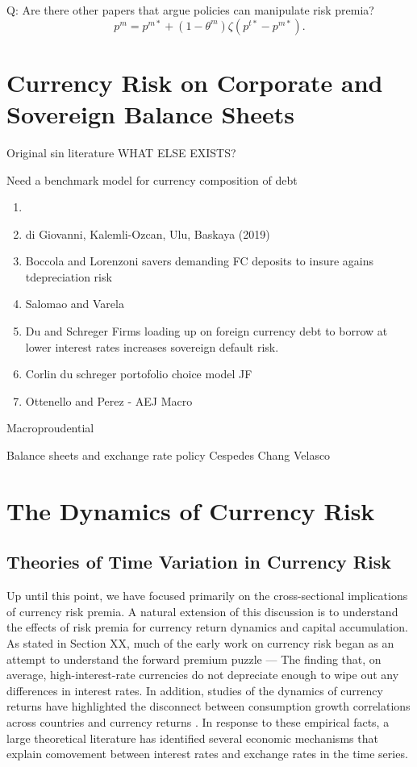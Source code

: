 \documentclass{ar-1col}
\begin{document}
Q: Are there other papers that argue policies can manipulate risk premia?
\begin{equation*}
  p^m = p^{m \ast} + (1 - \theta^m) \zeta (p^{t \ast} - p^{m \ast}).
\end{equation*}

\section{Currency Risk on Corporate and Sovereign Balance Sheets}
Original sin literature WHAT ELSE EXISTS?

Need a benchmark model for currency composition of debt
\begin{enumerate}
\item \citet{Richers2019}
\item di Giovanni, Kalemli-Ozcan, Ulu, Baskaya (2019)
\item Boccola and Lorenzoni savers demanding FC deposits to insure agains tdepreciation risk
\item Salomao and Varela
\item Du and Schreger Firms loading up on foreign currency debt to borrow at lower interest rates increases sovereign default risk.
\item Corlin du schreger portofolio choice model JF
\item Ottenello and Perez - AEJ Macro
\end{enumerate} 
Macroproudential

Balance sheets and exchange rate policy Cespedes Chang Velasco 


\section{The Dynamics of Currency Risk}


\subsection{Theories of Time Variation in Currency Risk}

Up until this point, we have focused primarily on the cross-sectional implications of currency risk premia. A natural extension of this discussion is to understand the effects of risk premia for currency return dynamics and capital accumulation. As stated in Section XX, much of the early work on currency risk began as an attempt to understand the forward premium puzzle --- The finding that, on average, high-interest-rate currencies do not depreciate enough to wipe out any differences in interest rates. In addition, studies of the dynamics of currency returns have highlighted the disconnect between consumption growth correlations across countries and currency returns \citet{BackusSmith1993}. In response to these empirical facts, a large theoretical literature has identified several economic mechanisms that explain comovement between interest rates and exchange rates in the time series. 
\end{document}
